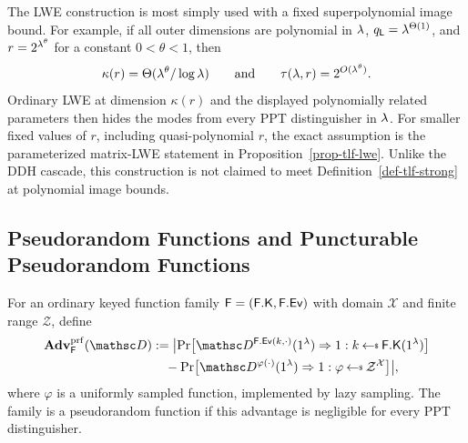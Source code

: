 

The LWE construction is most simply used with a fixed superpolynomial image
bound. For example, if all outer dimensions are polynomial in $\lambda$,
$q_{\mathsf L}=\lambda^{\Theta(1)}$, and $r=2^{\lambda^\theta}$ for a constant
$0<\theta<1$, then
$$
\kappa(r)=\Theta(\lambda^\theta/\log\lambda)
\qquad\text{and}\qquad
\tau(\lambda,r)=2^{O(\lambda^\theta)}.
$$
Ordinary LWE at dimension $\kappa(r)$ and the displayed polynomially related
parameters then hides the modes from every PPT distinguisher in $\lambda$.
For smaller fixed values of $r$, including quasi-polynomial $r$, the exact
assumption is the parameterized matrix-LWE statement in
Proposition~\ref{prop-tlf-lwe}. Unlike the DDH cascade, this construction is
not claimed to meet Definition~\ref{def-tlf-strong} at polynomial image
bounds.

\subsection{Pseudorandom Functions and Puncturable Pseudorandom Functions} \label{sec-pprf}

For an ordinary keyed function family $\mathsf{F}=(\mathsf{F}.\mathsf{K},\mathsf{F}.\mathsf{Ev})$ with domain $\mathcal X$ and finite range $\mathcal Z$, define
$$
\begin{aligned}
\AdvPRF{\PRF}{\advD}
&:=
\bigl|
\Pr\bigl[\advD^{\PRFEv(k,\cdot)}(\usecp)\Rightarrow1:
            k\getsr\PRFKg(\usecp)\bigr]\\
&\quad-
\Pr\bigl[\advD^{\varphi(\cdot)}(\usecp)\Rightarrow1:
            \varphi\getsr\mathcal Z^{\mathcal X}\bigr]
\bigr|,
\end{aligned}
$$
where $\varphi$ is a uniformly sampled function, implemented by lazy sampling. The family is a pseudorandom function if this advantage is negligible for every PPT distinguisher.

